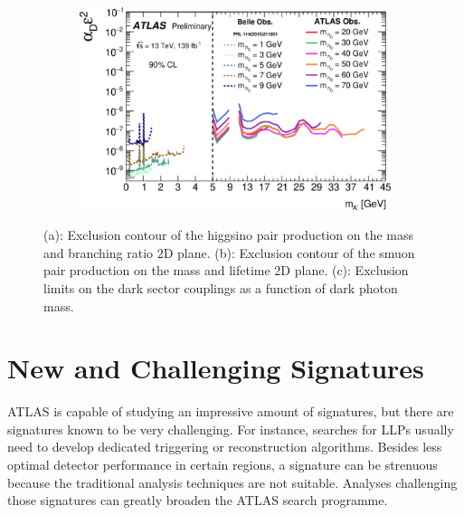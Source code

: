 \documentclass{moriond}
\begin{document}
\begin{figure}[htp]
\begin{subfigure}[b]{0.22\textwidth}
         \caption{}
         \label{fig:micro}
     \end{subfigure}
     \begin{subfigure}[b]{0.28\textwidth}
         \centering
         \includegraphics[width=\textwidth]{dark}
         \caption{}
         \label{fig:dark}
     \end{subfigure}
        \caption{(a): Exclusion contour of the higgsino pair production on the mass and branching ratio 2D plane\protect\cite{bbyy}. (b): Exclusion contour of the smuon pair production on the mass and lifetime 2D plane\protect\cite{micro}. (c): Exclusion limits on the dark sector couplings as a function of dark photon mass\protect\cite{dark}.}
        \label{fig:limits2}
\end{figure}

\section{New and Challenging Signatures}

ATLAS is capable of studying an impressive amount of signatures, but there are
signatures known to be very challenging. For instance, searches for LLPs
usually need to develop dedicated triggering or reconstruction algorithms.
Besides less optimal detector performance in certain regions, a signature can
be strenuous because the traditional analysis techniques are not suitable.
Analyses challenging those signatures can greatly broaden the ATLAS search
programme.\\
\end{document}
